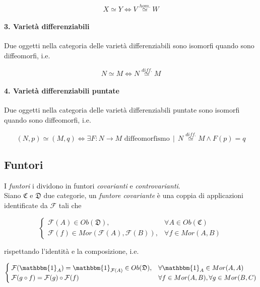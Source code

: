 \begin{equation}
	X \simeq Y \iff V \stackrel{hom.}{\simeq} W
\end{equation}

\paragraph{3. Varietà differenziabili}

Due oggetti nella categoria delle varietà differenziabili sono isomorfi quando sono diffeomorfi, i.e.

\begin{equation}
	N \simeq M \iff N \stackrel{diff.}{\simeq} M
\end{equation}

\paragraph{4. Varietà differenziabili puntate}

Due oggetti nella categoria delle varietà differenziabili puntate sono isomorfi quando sono diffeomorfi, i.e.

\begin{equation}
	(N,p) \simeq (M,q) \iff \exists F : N \to M \text{ diffeomorfismo} \, \mid \, N \stackrel{diff.}{\simeq} M \wedge F(p)=q
\end{equation}

\subsection{Funtori}

I \textit{funtori} i dividono in funtori \textit{covarianti} e \textit{controvarianti}.\\
Siano $ \mathfrak{C} $ e $ \mathfrak{D} $ due categorie, un \textit{funtore covariante} è una coppia di applicazioni identificate da $ \mathcal{F} $ tali che

\begin{equation}
	\begin{cases}
		\mathcal{F}(A) \in Ob(\mathfrak{D}), & \forall A \in Ob(\mathfrak{C})\\
		\mathcal{F}(f) \in Mor(\mathcal{F}(A),\mathcal{F}(B)), & \forall f \in Mor(A,B)
	\end{cases}
\end{equation}

rispettando l'identità e la composizione, i.e.

\begin{equation}
	\begin{cases}
		\mathcal{F}(\mathbbm{1}_{A}) = \mathbbm{1}_{\mathcal{F}(A)} \in Ob(\mathfrak{D}), & \forall \mathbbm{1}_{A} \in Mor(A,A)\\
		\mathcal{F}(g \circ f) = \mathcal{F}(g) \circ \mathcal{F}(f) & \forall f \in Mor(A,B), \forall g \in Mor(B,C)
	\end{cases}
\end{equation}

